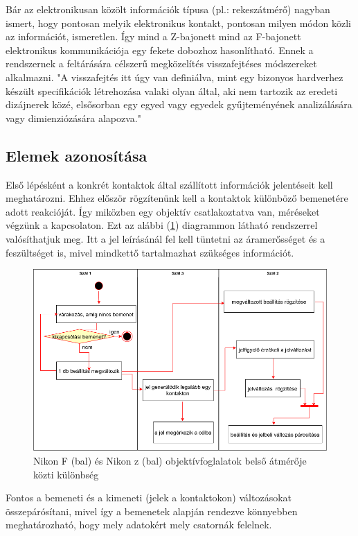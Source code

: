 Bár az elektronikusan közölt információk típusa (pl.: rekeszátmérő) nagyban ismert, hogy pontosan melyik elektronikus kontakt, pontosan milyen módon közli az információt, ismeretlen. Így mind a Z-bajonett mind az F-bajonett elektronikus kommunikációja egy fekete dobozhoz hasonlítható. Ennek a rendszernek a feltárására célszerű megközelítés visszafejtéses módszereket alkalmazni. "A visszafejtés itt úgy van definiálva, mint egy bizonyos hardverhez készült specifikációk létrehozása valaki olyan által, aki nem tartozik az eredeti dizájnerek közé, elsősorban egy egyed vagy egyedek gyűjteményének analizálására vagy dimienziózására alapozva."\cite{Reverse_engineering}
\subsection{Elemek azonosítása}
Első lépésként a konkrét kontaktok által szállított információk jelentéseit kell meghatározni. Ehhez először rögzítenünk kell a kontaktok különböző bemenetére adott reakcióját. Így miközben egy objektív csatlakoztatva van, méréseket végzünk a kapcsolaton. Ezt az alábbi (\ref{fig:jelparosito_UML}) diagrammon látható rendszerrel valósíthatjuk meg. Itt a jel leírásánál fel kell tüntetni az áramerősséget és a feszültséget is, mivel mindkettő tartalmazhat szükséges információt.
\begin{figure}[H]
	\centering
	\includegraphics[width=1.0\linewidth]{img/Reverse_2.drawio.png}
	\caption{Nikon F (bal) és Nikon z (bal) objektívfoglalatok belső átmérője közti különbség}
	\label{fig:jelparosito_UML}
\end{figure}
Fontos a bemeneti és a kimeneti (jelek a kontaktokon) változásokat összepárósítani, mivel így a bemenetek alapján rendezve könnyebben meghatározható, hogy mely adatokért mely csatornák felelnek.
